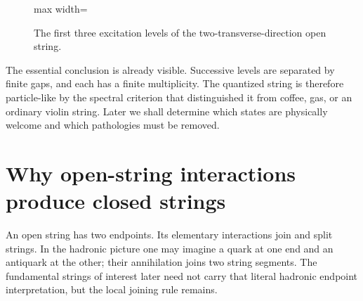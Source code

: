 \begin{figure}[H]
  \centering
  \begin{adjustbox}{max width=\linewidth}
  \end{adjustbox}
  \caption{The first three excitation levels of the two-transverse-direction
  open string.}
  \label{fig:l02-levels-redraw}
\end{figure}

\begin{classroomqa}
\end{classroomqa}

The essential conclusion is already visible. Successive levels are separated
by finite gaps, and each has a finite multiplicity. The quantized string is
therefore particle-like by the spectral criterion that distinguished it from
coffee, gas, or an ordinary violin string. Later we shall determine which
states are physically welcome and which pathologies must be removed.

\section{Why open-string interactions produce closed strings}

An open string has two endpoints. Its elementary interactions join and split
strings. In the hadronic picture one may imagine a quark at one end and an
antiquark at the other; their annihilation joins two string segments. The
fundamental strings of interest later need not carry that literal hadronic
endpoint interpretation, but the local joining rule remains.

